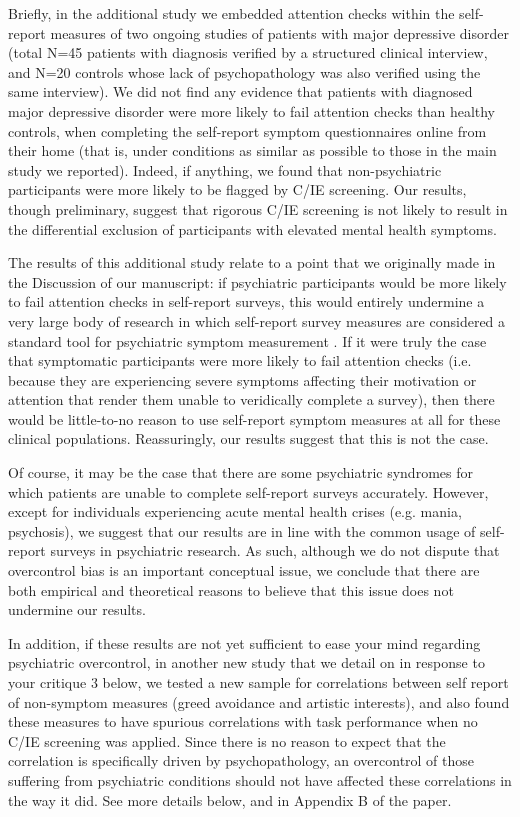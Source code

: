 \documentclass[a4paper,notitlepage,12pt]{article}
\begin{document}
Briefly, in the additional study we embedded attention checks within the self-report measures of two ongoing studies of patients with major depressive disorder (total N=45 patients with diagnosis verified by a structured clinical interview, and N=20 controls whose lack of psychopathology was also verified using the same interview). We did not find any evidence that patients with diagnosed major depressive disorder were more likely to fail attention checks than healthy controls, when completing the self-report symptom questionnaires online from their home (that is, under conditions as similar as possible to those in the main study we reported). Indeed, if anything, we found that non-psychiatric participants were more likely to be flagged by C/IE screening. Our results, though preliminary, suggest that rigorous C/IE screening is not likely to result in the differential exclusion of participants with elevated mental health symptoms.

The results of this additional study relate to a point that we originally made in the Discussion of our manuscript: if psychiatric participants would be more likely to fail attention checks in self-report surveys, this would entirely undermine a very large body of research in which self-report survey measures are considered a standard tool for psychiatric symptom measurement \cite{Demetriou2015-bq}. If it were truly the case that symptomatic participants were more likely to fail attention checks (i.e. because they are experiencing severe symptoms affecting their motivation or attention that render them unable to veridically complete a survey), then there would be little-to-no reason to use self-report symptom measures at all for these clinical populations. Reassuringly, our results suggest that this is not the case.

Of course, it may be the case that there are some psychiatric syndromes for which patients are unable to complete self-report surveys accurately. However, except for individuals experiencing acute mental health crises (e.g. mania, psychosis), we suggest that our results are in line with the common usage of self-report surveys in psychiatric research. As such, although we do not dispute that overcontrol bias is an important conceptual issue, we conclude that there are both empirical and theoretical reasons to believe that this issue does not undermine our results.

In addition, if these results are not yet sufficient to ease your mind regarding psychiatric overcontrol, in another new study that we detail on in response to your critique 3 below, we tested a new sample for correlations between self report of non-symptom measures (greed avoidance and artistic interests), and also found these measures to have spurious correlations with task performance when no C/IE screening was applied. Since there is no reason to expect that the correlation is specifically driven by psychopathology, an overcontrol of those suffering from psychiatric conditions should not have affected these correlations in the way it did. See more details below, and in Appendix B of the paper. 
\end{document}
